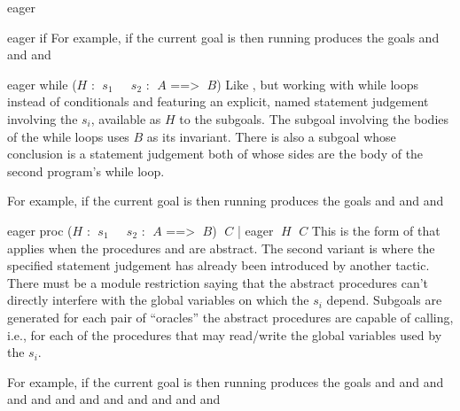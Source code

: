 \begin{tactic}{eager}
\begin{tsyntax}{eager if}
  \medskip
  For example, if the current goal is
   then
  running 
  produces the goals
  and
  and
  and
  \end{tsyntax}

  \begin{tsyntax}{eager while ($H$ : $\;s_1$ ~ $\;s_2$ :
    $\;A$ ==> $\;B$)}
  Like , but working with while loops instead of
  conditionals and featuring an explicit, named \prhl statement
  judgement involving the $s_i$, available as $H$ to the subgoals.
  The subgoal involving the bodies of the while loops uses $B$ as its
  invariant. There is also a subgoal whose conclusion is a \prhl
  statement judgement both of whose sides are the body of the second
  program's while loop.

  \medskip
  For example, if the current goal is
   then
  running 
  produces the goals
  and
  and
  and
  \end{tsyntax}

  \begin{tsyntax}{eager proc ($H$ : $\;s_1$ ~ $\;s_2$ :
    $\;A$ ==> $\;B$) $\;C$ | eager $\;H$ $\;C$}
  This is the form of  that applies when the procedures
   and  are abstract.  The second variant is
  where the specified \prhl statement judgement has already been
  introduced by another  tactic. There must be a module
  restriction saying that the abstract procedures can't directly
  interfere with the global variables on which the $s_i$
  depend. Subgoals are generated for each pair of ``oracles'' the
  abstract procedures are capable of calling, i.e., for each of the
  procedures that may read/write the global variables used by the
  $s_i$.

  \medskip
  For example, if the current goal is
   then
  running 
  produces the goals
  and
  and
  and
  and
  and
  and
  and
  and
  and
  and
  and
  and
  \end{tsyntax}


\end{tactic}
